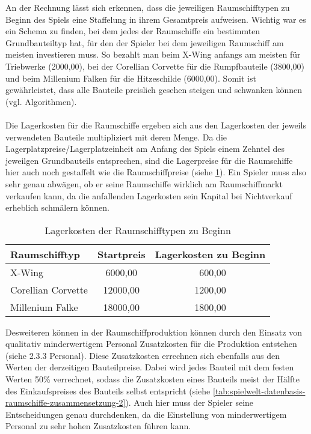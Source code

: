 An der Rechnung lässt sich erkennen, dass die jeweiligen Raumschifftypen zu Beginn des Spiels eine Staffelung in ihrem Gesamtpreis aufweisen. Wichtig war es ein Schema zu finden, bei dem jedes der Raumschiffe ein bestimmten Grundbauteiltyp hat, für den der Spieler bei dem jeweiligen Raumschiff am meisten investieren muss. So bezahlt man beim X-Wing anfangs am meisten für Triebwerke (2000,00\curr{}), bei der Corellian Corvette für die Rumpfbauteile (3800,00\curr{}) und beim Millenium Falken für die Hitzeschilde (6000,00\curr{}). Somit ist gewährleistet, dass alle Bauteile preislich gesehen steigen und schwanken können (vgl. Algorithmen). 
\\
\\
Die Lagerkosten für die Raumschiffe ergeben sich aus den Lagerkosten der jeweils verwendeten Bauteile multipliziert mit deren Menge. Da die Lagerplatzpreise/Lagerplatzeinheit am Anfang des Spiels einem Zehntel des jeweilgen Grundbauteils entsprechen, sind die Lagerpreise für die Raumschiffe hier auch noch gestaffelt wie die Raumschiffpreise (siehe \ref{tab:spielwelt-datenbasis-raumschiffe-zusammensetzung-1}). Ein Spieler muss also sehr genau abwägen, ob er seine Raumschiffe wirklich am Raumschiffmarkt verkaufen kann, da die anfallenden Lagerkosten sein Kapital bei Nichtverkauf erheblich schmälern können.

\begin{table}[ht]\small
     \centering
     \begin{tabular}{ | l | c | c | }
          \hline
          Raumschifftyp & Startpreis & Lagerkosten zu Beginn \\
          \hline \hline
          X-Wing &  6000,00\curr{} & \ 600,00\curr{}\\ \hline
          Corellian Corvette & 12000,00\curr{} & 1200,00\curr{}\\ \hline
          Millenium Falke & 18000,00\curr{} & 1800,00\curr{} \\
          \hline
     \end{tabular}
     \caption{Lagerkosten der Raumschifftypen zu Beginn}
     \label{tab:spielwelt-datenbasis-raumschiffe-zusammensetzung-1}
\end{table}

Desweiteren können in der Raumschiffproduktion können durch den Einsatz von qualitativ minderwertigem Personal Zusatzkosten für die Produktion entstehen (siehe 2.3.3 Personal). Diese Zusatzkosten errechnen sich ebenfalls aus den Werten der derzeitigen Bauteilpreise. Dabei wird jedes Bauteil mit dem festen Werten 50\% verrechnet, sodass die Zusatzkosten eines Bauteils meist der Hälfte des Einkaufspreises des Bauteils selbst entspricht (siehe \ref{tab:spielwelt-datenbasis-raumschiffe-zusammensetzung-2}). Auch hier muss der Spieler seine Entscheidungen genau durchdenken, da die Einstellung von minderwertigem Personal zu sehr hohen Zusatzkosten führen kann.

